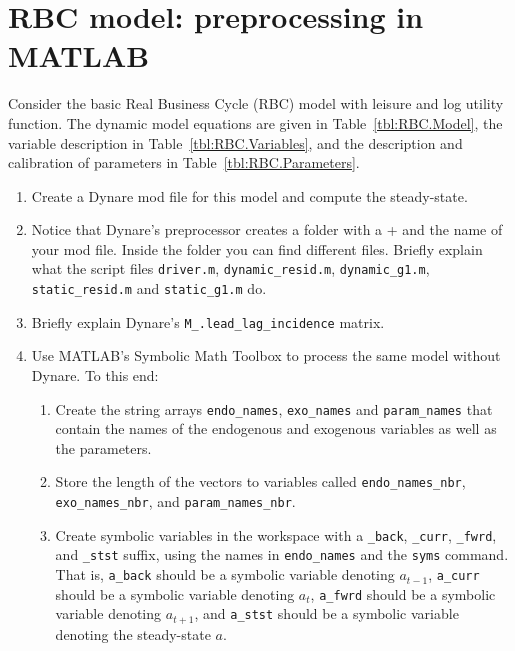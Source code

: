 \section[RBC model: preprocessing in MATLAB]{RBC model: preprocessing in MATLAB\label{ex:PreprocessMATLABRBC}}
Consider the basic Real Business Cycle (RBC) model with leisure and log utility function.
The dynamic model equations are given in Table~\ref{tbl:RBC.Model},
  the variable description in Table~\ref{tbl:RBC.Variables},
  and the description and calibration of parameters in Table~\ref{tbl:RBC.Parameters}.

{\footnotesize

}%

\begin{enumerate}

\item
Create a Dynare mod file for this model and compute the steady-state.

\item
Notice that Dynare's preprocessor creates a folder with a + and the name of your mod file.
Inside the folder you can find different files.
Briefly explain what the script files \texttt{driver.m},
  \texttt{dynamic\_resid.m}, \texttt{dynamic\_g1.m},
  \texttt{static\_resid.m} and \texttt{static\_g1.m} do.

\item
Briefly explain Dynare's \texttt{M\_.lead\_lag\_incidence} matrix.

\item
Use MATLAB's Symbolic Math Toolbox to process the same model without Dynare.
To this end:

\begin{enumerate}

  \item
  Create the string arrays
  \texttt{endo\_names}, \texttt{exo\_names} and \texttt{param\_names}
  that contain the names of the endogenous and exogenous variables
    as well as the parameters.
  
  \item
  Store the length of the vectors to variables called
    \texttt{endo\_names\_nbr}, \texttt{exo\_names\_nbr}, and \texttt{param\_names\_nbr}.

  \item
  Create symbolic variables in the workspace with a
    \texttt{\_back}, \texttt{\_curr}, \texttt{\_fwrd}, and \texttt{\_stst} suffix,
	using the names in \texttt{endo\_names} and the \texttt{syms} command.
  That is, \texttt{a\_back} should be a symbolic variable denoting \(a_{t-1}\),
	\texttt{a\_curr} should be a symbolic variable denoting \(a_{t}\),
	\texttt{a\_fwrd} should be a symbolic variable denoting \(a_{t+1}\),
	and \texttt{a\_stst} should be a symbolic variable denoting the steady-state \(a\).


\end{enumerate}
\end{enumerate}
